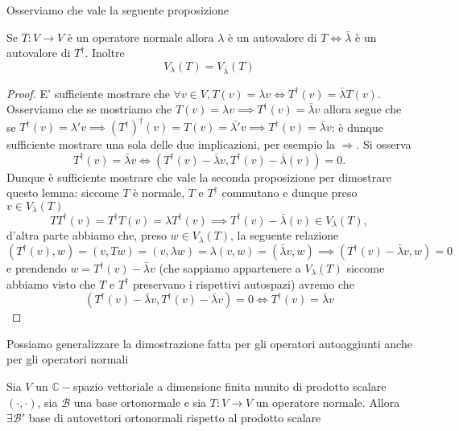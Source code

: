 \documentclass[12pt, twoside, italian, openany]{book}
\begin{document}
	Osserviamo che vale la seguente proposizione
	\begin{lemma}
		Se $T: V \to V$ è un operatore normale allora $\lambda$ è un autovalore di $T \iff \bar{\lambda}$ è un autovalore di $T^{\dag}$. Inoltre
		$$
			V_\lambda(T) = V_{\bar{\lambda}}(T)
		$$
	\end{lemma}
	\begin{proof}
		E' sufficiente mostrare che $\forall v \in V, T(v) = \lambda v \iff T^{\dag}(v) = \bar{\lambda} T(v)$. Osserviamo che se mostriamo che $T(v) = \lambda v \implies T^{\dag} (v) = \bar{\lambda} v$ allora segue che se $T^{\dag}(v) = \lambda' v \implies (T^{\dag})^{\dag} (v) = T(v) = \bar{\lambda'}v \implies T^{\dag}(v) = \bar{\lambda}v$: è dunque sufficiente mostrare una sola delle due implicazioni, per esempio la $\Rightarrow$. Si osserva
		$$
		T^\dag (v) = \bar{\lambda} v \iff (T^\dag(v) - \bar{\lambda}{v}, T^{\dag}(v) - \bar{\lambda}(v)) = 0.
		$$
		Dunque è sufficiente mostrare che vale la seconda proposizione per dimostrare questo lemma: siccome $T$ è normale, $T$ e $T^{\dag}$ commutano e dunque preso $v \in V_\lambda(T)$
		$$
		T T^{\dag} (v) = T^{\dag} T(v) = \lambda T^{\dag} (v) \implies T^{\dag}(v) - \bar{\lambda}(v) \in V_{\lambda}(T),
		$$
		d'altra parte abbiamo che, preso $w \in V_\lambda(T)$, la seguente relazione
		$$
		(T^{\dag}(v), w) = (v, Tw) =  (v, \lambda w) = \lambda (v, w) = (\bar{\lambda}v, w) \implies (T^{\dag}(v) - \bar{\lambda}v, w) = 0
		$$
		e prendendo $w = T^{\dag}(v) - \bar{\lambda}v$ (che sappiamo appartenere a $V_\lambda(T)$ siccome abbiamo visto che $T$ e $T^{\dag}$ preservano i rispettivi autospazi) avremo che
		$$
		(T^{\dag}(v) - \bar{\lambda}v, T^{\dag}(v) - \bar{\lambda} v) = 0 \iff T^{\dag}(v) = \bar{\lambda}v
		$$
	\end{proof}
	Possiamo generalizzare la dimostrazione fatta per gli operatori autoaggiunti anche per gli operatori normali
	\begin{theorem}
		Sia $V$ un $\mathbb{C}-$spazio vettoriale a dimensione finita munito di prodotto scalare $(\cdot, \cdot)$, sia $\mathcal{B}$ una base ortonormale e sia $T: V \to V$ un operatore normale. Allora $\exists \mathcal{B}'$ base di autovettori ortonormali rispetto al prodotto scalare 
	\end{theorem}
\end{document}
